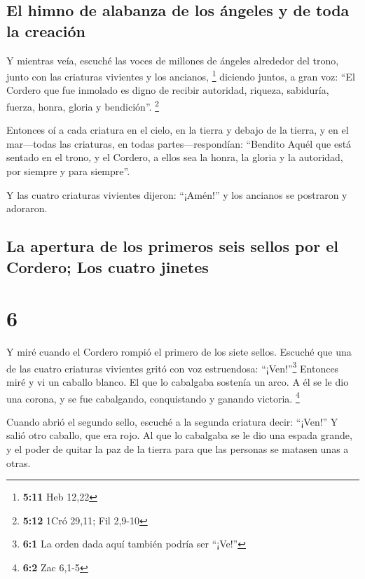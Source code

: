 \hypertarget{el-himno-de-alabanza-de-los-uxe1ngeles-y-de-toda-la-creaciuxf3n}{%
\subsection{El himno de alabanza de los ángeles y de toda la
creación}\label{el-himno-de-alabanza-de-los-uxe1ngeles-y-de-toda-la-creaciuxf3n}}

 Y mientras veía, escuché las voces de millones de
ángeles alrededor del trono, junto con las criaturas vivientes y los
ancianos, \footnote{\textbf{5:11} Heb 12,22}  diciendo
juntos, a gran voz: ``El Cordero que fue inmolado es digno de recibir
autoridad, riqueza, sabiduría, fuerza, honra, gloria y bendición''.
\footnote{\textbf{5:12} 1Cró 29,11; Fil 2,9-10}

 Entonces oí a cada criatura en el cielo, en la tierra y
debajo de la tierra, y en el mar---todas las criaturas, en todas
partes---respondían: ``Bendito Aquél que está sentado en el trono, y el
Cordero, a ellos sea la honra, la gloria y la autoridad, por siempre y
para siempre''.

 Y las cuatro criaturas vivientes dijeron: ``¡Amén!'' y
los ancianos se postraron y adoraron.

\hypertarget{la-apertura-de-los-primeros-seis-sellos-por-el-cordero-los-cuatro-jinetes}{%
\subsection{La apertura de los primeros seis sellos por el Cordero; Los
cuatro
jinetes}\label{la-apertura-de-los-primeros-seis-sellos-por-el-cordero-los-cuatro-jinetes}}

\hypertarget{section-5}{%
\section{6}\label{section-5}}

 Y miré cuando el Cordero rompió el primero de los siete
sellos. Escuché que una de las cuatro criaturas vivientes gritó con voz
estruendosa: ``¡Ven!''\footnote{\textbf{6:1} La orden dada aquí también
  podría ser ``¡Ve!''}  Entonces miré y vi un caballo
blanco. El que lo cabalgaba sostenía un arco. A él se le dio una corona,
y se fue cabalgando, conquistando y ganando victoria. \footnote{\textbf{6:2}
  Zac 6,1-5}

 Cuando abrió el segundo sello, escuché a la segunda
criatura decir: ``¡Ven!''  Y salió otro caballo, que era
rojo. Al que lo cabalgaba se le dio una espada grande, y el poder de
quitar la paz de la tierra para que las personas se matasen unas a
otras.

